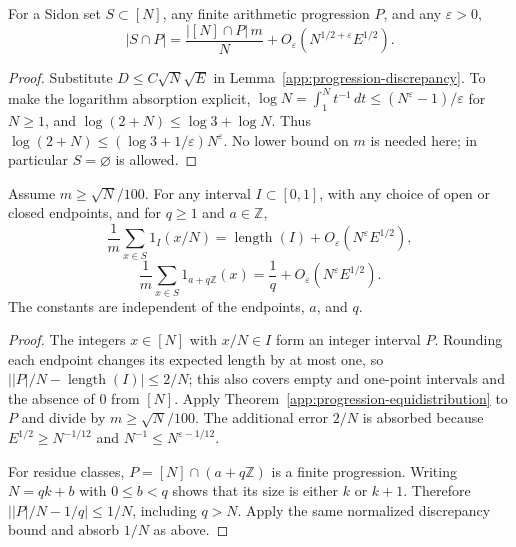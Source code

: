 \begin{theorem}
\label{app:progression-equidistribution}
\leanok
{}
For a Sidon set $S\subset[N]$, any finite arithmetic progression $P$, and
any $\varepsilon>0$,
\[
 |S\cap P|=\frac{|[N]\cap P|\,m}{N}
       +O_{\varepsilon}(N^{1/2+\varepsilon}E^{1/2}).
\]
\end{theorem}
\begin{proof}
Substitute $D\leq C\sqrt N\sqrt E$ in
Lemma~\ref{app:progression-discrepancy}.  To make the logarithm absorption
explicit, $\log N=\int_1^N t^{-1}\,dt\leq(N^{\varepsilon}-1)/\varepsilon$
for $N\geq1$, and $\log(2+N)\leq\log3+\log N$.
Thus $\log(2+N)\leq(\log3+1/\varepsilon)N^{\varepsilon}$.
No lower bound on $m$ is needed here; in particular $S=\varnothing$ is allowed.
\end{proof}

\begin{corollary}
\label{app:interval-residue-corollaries}
\leanok
{}
Assume $m\geq\sqrt N/100$.  For any interval $I\subset[0,1]$, with any
choice of open or closed endpoints, and for $q\geq1$ and $a\in\mathbb Z$,
\[
 \frac1m\sum_{x\in S}1_I(x/N)
 =\operatorname{length}(I)+O_{\varepsilon}(N^{\varepsilon}E^{1/2}),
\]
\[
 \frac1m\sum_{x\in S}1_{a+q\mathbb Z}(x)
 =\frac1q+O_{\varepsilon}(N^{\varepsilon}E^{1/2}).
\]
The constants are independent of the endpoints, $a$, and $q$.
\end{corollary}
\begin{proof}
The integers $x\in[N]$ with $x/N\in I$ form an integer interval $P$.
Rounding each endpoint changes its expected length by at most one, so
$\big||P|/N-\operatorname{length}(I)\big|\leq2/N$; this also covers empty
and one-point intervals and the absence of $0$ from $[N]$.
Apply Theorem~\ref{app:progression-equidistribution} to $P$ and divide by
$m\geq\sqrt N/100$.  The additional error $2/N$ is absorbed because
$E^{1/2}\geq N^{-1/12}$ and $N^{-1}\leq N^{\varepsilon-1/12}$.

For residue classes, $P=[N]\cap(a+q\mathbb Z)$ is a finite progression.
Writing $N=qk+b$ with $0\leq b<q$ shows that its size is either $k$ or
$k+1$.  Therefore $\big||P|/N-1/q\big|\leq1/N$, including $q>N$.
Apply the same normalized discrepancy bound and absorb $1/N$ as above.
\end{proof}

